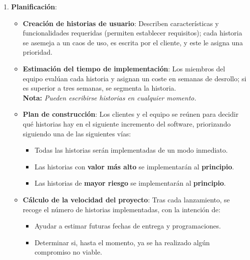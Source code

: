 \begin{enumerate}

   \item \textbf{Planificación}:
         
      \begin{itemize}
            \item \textbf{Creación de historias de usuario}: Describen características y funcionalidades requeridas (permiten establecer requisitos); cada historia se asemeja a un caos de uso, es escrita por el cliente, y este le asigna una prioridad.
            \item \textbf{Estimación del tiempo de implementación}: Los miembros del equipo evalúan cada historia y asignan un coste en semanas de desrollo; si es superior a tres semanas, se segmenta la historia.\\
            \textbf{Nota:} \textit{Pueden escribirse historias en cualquier momento.}
            \item \textbf{Plan de construcción}: Los clientes y el equipo se reúnen para decidir qué historias hay en el siguiente incremento del software, priorizando siguiendo una de las siguientes vías:
                  \begin{itemize}
                     \item Todas las historias serán implementadas de un modo inmediato.
                     \item Las historias con \textbf{valor más alto} se implementarán al \textbf{principio}.
                     \item Las historias de \textbf{mayor riesgo} se implementarán al \textbf{principio}.
                  \end{itemize}
            \item \textbf{Cálculo de la velocidad del proyecto}: Tras cada lanzamiento, se recoge el número de historias implementadas, con la intención de:
                  \begin{itemize}
                     \item Ayudar a estimar futuras fechas de entrega y programaciones.
                     \item Determinar si, hasta el momento, ya se ha realizado algún compromiso no viable.
                  \end{itemize}
         \end{itemize}



\end{enumerate}
